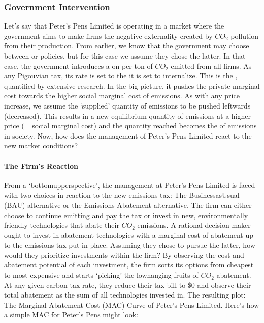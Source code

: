 \documentclass[letterpaper,10pt,english]{jupyterBook}
\begin{document}
\subsubsection{Government Intervention}
\label{\detokenize{content/12-environmental/textbook1:government-intervention}}
\sphinxAtStartPar
Let’s say that Peter’s Pens Limited is operating in a market where the government aims to make firms  the negative externality created by \(CO_2\) pollution from their production. From earlier, we know that the government may choose between  or  policies, but for this case we assume they chose the latter. In that case, the government introduces a  on per ton of \(CO_2\) emitted from all firms. As any Pigouvian tax, its rate is set to the  it is set to internalize. This is the , quantified by extensive research. In the big picture, it pushes the private marginal cost towards the higher social marginal cost of emissions. As with any price increase, we assume the ‘supplied’ quantity of emissions to be pushed leftwards (decreased). This results in a new equilibrium quantity of emissions at a higher price (= social marginal cost) and the quantity reached becomes the  of emissions in society. Now, how does the management of Peter’s Pens Limited react to the new market conditions?

\sphinxAtStartPar
{}


\paragraph{The Firm’s Reaction}
\label{\detokenize{content/12-environmental/textbook1:the-firms-reaction}}
\sphinxAtStartPar
From a ‘bottom\sphinxhyphen{}up\sphinxhyphen{}perspective’, the management at Peter’s Pens Limited is faced with two choices in reaction to the new emissions tax: The Business\sphinxhyphen{}as\sphinxhyphen{}Usual (BAU) alternative or the Emissions Abatement alternative. The firm can either choose to continue emitting and pay the tax or invest in new, environmentally friendly technologies that abate their \(CO_2\) emissions. A rational decision maker ought to invest in abatement technologies with a marginal cost of abatement up to the emissions tax put in place. Assuming they chose to pursue the latter, how would they prioritize investments within the firm? By observing the cost and abatement potential of each investment, the firm sorts its options from cheapest to most expensive and starts ‘picking’ the low\sphinxhyphen{}hanging fruits of \(CO_2\) abatement. At any given carbon tax rate, they reduce their tax bill to \$0 and observe their total abatement as the sum of all technologies invested in. The resulting plot: The Marginal Abatement Cost (MAC) Curve of Peter’s Pens Limited. Here’s how a simple MAC for Peter’s Pens might look:
\end{document}
